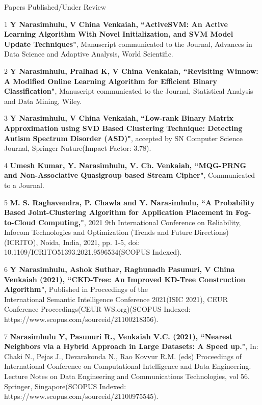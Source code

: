 \documentclass{resume} %
\begin{document}
\pagebreak

\begin{rSection}{Papers Published/Under Review}
	
	\begin{rSubsection}{}{}{}{}
		
		\item[1] \textbf{Y Narasimhulu, V China Venkaiah, ``ActiveSVM: An Active Learning Algorithm With Novel Initialization, and SVM Model Update Techniques"}, Manuscript communicated to the Journal, Advances in Data Science and Adaptive Analysis, World Scientific. 
		
		\item[2] \textbf{Y Narasimhulu, Pralhad K, V China Venkaiah, ``Revisiting Winnow: A Modified Online Learning Algorithm for Efficient Binary Classification"}, Manuscript communicated to the Journal, Statistical Analysis and Data Mining, Wiley.
		
		\item[3] \textbf{Y Narasimhulu, V China Venkaiah, ``Low-rank Binary Matrix Approximation using SVD Based Clustering Technique: Detecting Autism Spectrum Disorder (ASD)"}, accepted by SN Computer Science Journal, Springer Nature(Impact Factor: 3.78).
		
		\item[4] \textbf{Umesh Kumar, Y. Narasimhulu, V. Ch. Venkaiah, ``MQG-PRNG and Non-Associative Quasigroup based Stream Cipher"}, Communicated to a Journal.
		
		\item[5] \textbf{M. S. Raghavendra, P. Chawla and Y. Narasimhulu, ``A Probability Based Joint-Clustering Algorithm for Application Placement in Fog-to-Cloud Computing,"}, 2021 9th International Conference on Reliability, Infocom Technologies and Optimization (Trends and Future Directions) (ICRITO), Noida, India, 2021, pp. 1-5, doi: 10.1109/ICRITO51393.2021.9596534(SCOPUS Indexed).
		
		\item[6] \textbf{Y Narasimhulu, Ashok Suthar, Raghunadh Pasunuri, V China Venkaiah (2021), ``CKD-Tree: An Improved KD-Tree Construction Algorithm"}, Published in Proceedings of the \\ International Semantic Intelligence Conference 2021(ISIC 2021), CEUR Conference Proceedings(CEUR-WS.org)(SCOPUS Indexed: https://www.scopus.com/sourceid/21100218356).
		
		\item[7] \textbf{Narasimhulu Y, Pasunuri R., Venkaiah V.C. (2021), ``Nearest Neighbors via a Hybrid Approach in Large Datasets: A Speed up."}, In: Chaki N., Pejas J., Devarakonda N., Rao Kovvur R.M. (eds) Proceedings of International Conference on Computational Intelligence and Data Engineering. Lecture Notes on Data Engineering and Communications Technologies, vol 56. Springer, Singapore(SCOPUS Indexed: https://www.scopus.com/sourceid/21100975545).
		

\end{rSubsection}
\end{rSection}
\end{document}
